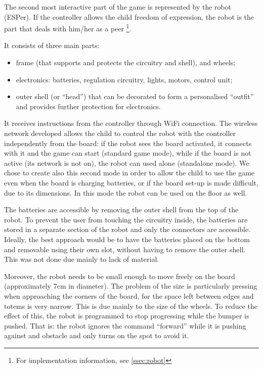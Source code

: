 \documentclass[a4paper,twoside]{book}
\begin{document}
The second most interactive part of the game is represented by the robot (ESPer). If the controller allows the child freedom of expression, the robot is the part that deals with him/her as a peer%
\footnote{For implementation information, see \autoref{ssec:robot}}.

\beforelist It consists of three main parts:
\begin{itemize}
\item frame (that supports and protects the circuitry and shell), and wheels;
\item electronics: batteries, regulation circuitry, lights, motors, control unit;
\item outer shell (or \textquotedblleft{}head\textquotedblright{}) that can be decorated to form a personalised \textquotedblleft{}outfit\textquotedblright{}  and provides further protection for electronics.
\end{itemize}
\afterlist*
It receives instructions from the controller through WiFi connection. The wireless network developed allows the child to control the robot with the controller independently from the board: if the robot sees the board activated, it connects with it and the game can start (standard game mode), while if the board is not active (its network is not on), the robot can used alone (standalone mode). We chose to create also this second mode in order to allow the child to use the game even when the board is charging batteries, or if the board set-up is made difficult, due to its dimensions. In this mode the robot can be used on the floor as well.

The batteries are accessible by removing the outer shell from the top of the robot. To prevent the user from touching the circuitry inside, the batteries are stored in a separate section of the robot and only the connectors are accessible.
Ideally, the best approach would be to have the batteries placed on the bottom and removable using their own slot, without having to remove the outer shell. This was not done due mainly to lack of material.

Moreover, the robot needs to be small enough to move freely on the board (approximately 7cm in diameter). The problem of the size is particularly pressing when approaching the corners of the board, for the space left between edges and totems is very narrow. This is due mainly to the size of the wheels. To reduce the effect of this, the robot is programmed to stop progressing while the bumper is pushed. That is: the robot ignores the command \textquotedblleft{}forward\textquotedblright{}  while it is pushing against and obstacle and only turns on the spot to avoid it.
\end{document}
